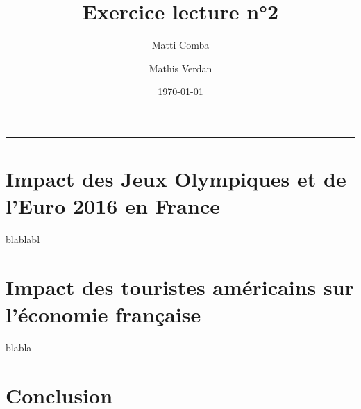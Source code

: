 \documentclass{article}
\title{Exercice lecture n°2}
\author{Matti Comba \and Mathis Verdan}
\date{\today}
\begin{document}
\maketitle
\begin{center}
  \rule{\linewidth}{0.5mm}
\end{center}


\section{Impact des Jeux Olympiques et de l'Euro 2016 en France}
blablabl

\section{Impact des touristes américains sur l'économie française}
blabla
\section{Conclusion}
\end{document}
